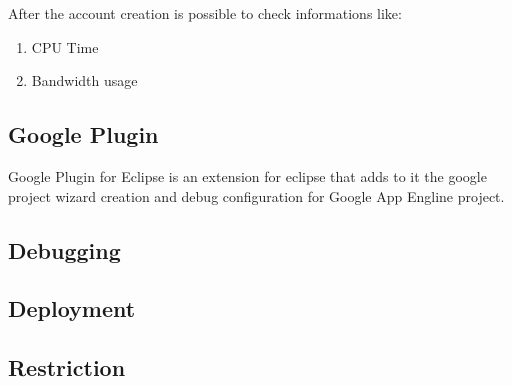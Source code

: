\documentclass{article}
\begin{document}
After the account creation is possible to check informations like:
\begin{enumerate}
\item CPU Time
\item Bandwidth usage
\end{enumerate}



\subsection{Google Plugin}

Google Plugin for Eclipse is an extension for eclipse that adds to it the google project wizard creation and debug configuration for Google App Engline project.

\subsection{Debugging}
\subsection{Deployment}
\subsection{Restriction}
\end{document}
